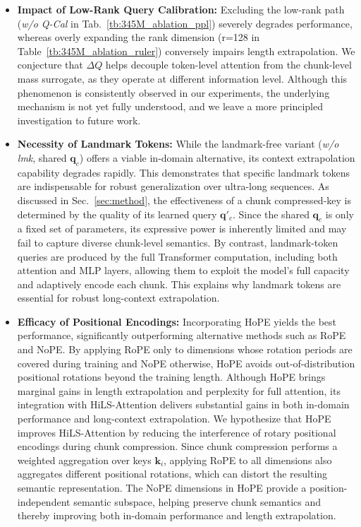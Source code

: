 


\begin{itemize}[leftmargin=*,itemsep=0.2em,topsep=0.3em]
    
    
    \item \textbf{Impact of Low-Rank Query Calibration:} Excluding the low-rank path (\textit{w/o Q-Cal} in Tab.~\ref{tb:345M_ablation_ppl}) severely degrades performance, whereas overly expanding the rank dimension (r=128 in Table~\ref{tb:345M_ablation_ruler}) conversely impairs length extrapolation. 
    We conjecture that $\Delta Q$ helps decouple token-level attention from the chunk-level mass surrogate, as they operate at different information level. Although this phenomenon is consistently observed in our experiments, the underlying mechanism is not yet fully understood, and we leave a more principled investigation to future work.
    
    \item \textbf{Necessity of Landmark Tokens:} While the landmark-free variant (\textit{w/o lmk}, shared $\mathbf{q}_c$) offers a viable in-domain alternative, its context extrapolation capability degrades rapidly. This demonstrates that specific landmark tokens are indispensable for robust generalization over ultra-long sequences. 
    As discussed in Sec.~\ref{sec:method}, the effectiveness of a chunk compressed-key is determined by the quality of its learned query $\mathbf{q}'_c$. Since the shared $\mathbf{q}_c$ is only a fixed set of parameters, its expressive power is inherently limited and may fail to capture diverse chunk-level semantics. By contrast, landmark-token queries are produced by the full Transformer computation, including both attention and MLP layers, allowing them to exploit the model's full capacity and adaptively encode each chunk. This explains why landmark tokens are essential for robust long-context extrapolation.

    \item \textbf{Efficacy of Positional Encodings:} Incorporating HoPE yields the best performance, significantly outperforming alternative methods such as RoPE and NoPE. 
    By applying RoPE only to dimensions whose rotation periods are covered during training and NoPE otherwise, HoPE avoids out-of-distribution positional rotations beyond the training length.
    Although HoPE brings marginal gains in length extrapolation and perplexity for full attention, its integration with HiLS-Attention delivers substantial gains in both in-domain performance and long-context extrapolation.
    We hypothesize that HoPE improves HiLS-Attention by reducing the interference of rotary positional encodings during chunk compression. Since chunk compression performs a weighted aggregation over keys $\mathbf{k}_i$, applying RoPE to all dimensions also aggregates different positional rotations, which can distort the resulting semantic representation. The NoPE dimensions in HoPE provide a position-independent semantic subspace, helping preserve chunk semantics and thereby improving both in-domain performance and length extrapolation.
\end{itemize}



